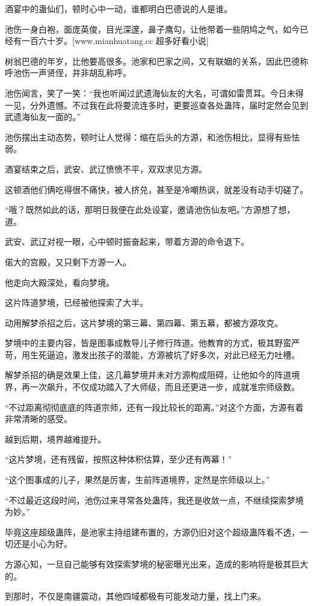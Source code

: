 \begin{this_body}
酒宴中的蛊仙们，顿时心中一动，谁都明白巴德说的人是谁。

池伤一身白袍，面庞英俊，目光深邃，鼻子鹰勾，让他带着一些阴鸠之气，如今已经有一百六十岁。[www.mianhuatang.cc 超多好看小说]

树翁巴德的年岁，比他要高很多。池家和巴家之间，又有联姻的关系，因此巴德称呼池伤一声贤侄，并非胡乱称呼。

池伤闻言，笑了一笑：“我也听闻过武遗海仙友的大名，可谓如雷贯耳。今日未得一见，分外遗憾。不过我在此将要流连多时，更要巡查各处蛊阵，届时定然会见到武遗海仙友一面的。”

池伤摆出主动态势，顿时让人觉得：缩在后头的方源，和池伤相比，显得有些怯弱。

酒宴结束之后，武安、武辽愤愤不平，双双求见方源。

这顿酒他们俩吃得很不痛快，被人挤兑，甚至是冷嘲热讽，就差没有动手切磋了。

“哦？既然如此的话，那明日我便在此处设宴，邀请池伤仙友吧。”方源想了想，道。

武安、武辽对视一眼，心中顿时振奋起来，带着方源的命令退下。

偌大的宫殿，又只剩下方源一人。

他走向大殿深处，看向梦境。

这片阵道梦境，已经被他探索了大半。

动用解梦杀招之后，这片梦境的第三幕、第四幕、第五幕，都被方源攻克。

梦境中的主要内容，皆是图事成教导儿子修行阵道。他教育的方式，极其野蛮严苛，用生死逼迫，激发出孩子的潜能，方源被坑了好多次，对此已经无力吐槽。

解梦杀招的确是效果上佳，这几幕梦境并未对方源构成阻碍，让他如今的阵道境界，再一次飙升，不仅成功踏入了大师级，而且还更进一步，成就准宗师级数。

“不过距离彻彻底底的阵道宗师，还有一段比较长的距离。”对这个方面，方源有着非常清晰的感受。

越到后期，境界越难提升。

“这片梦境，还有残留，按照这种体积估算，至少还有两幕！”

“这个图事成的儿子，果然是厉害，生前阵道境界，定然是宗师级以上。”

“不过最近这段时间，池伤过来寻常各处蛊阵，我还是收敛一点，不继续探索梦境为妙。”

毕竟这座超级蛊阵，是池家主持组建布置的，方源仍旧对这个超级蛊阵看不透，一切还是小心为好。

方源心知，一旦自己能够有效探索梦境的秘密曝光出来，造成的影响将是极其巨大的。

到那时，不仅是南疆震动，其他四域都极有可能发动力量，找上门来。


\end{this_body}
